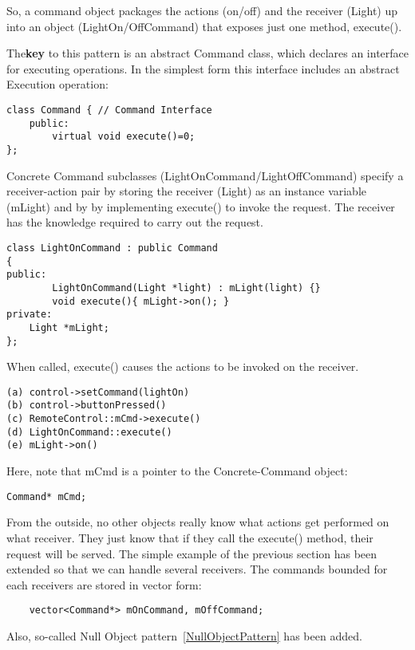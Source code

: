 \documentclass{book}
\begin{document}
So, a command object packages the actions (on/off) and the receiver (Light) up into an object (LightOn/OffCommand) that exposes just one method, execute().

The\textbf{key} to this pattern is an abstract Command class, which declares an interface for executing operations. In the simplest form this interface includes an abstract Execution operation:

\begin{verbatim}
class Command { // Command Interface
    public:
    	virtual void execute()=0;
};
\end{verbatim}
Concrete Command subclasses (LightOnCommand/LightOffCommand) specify a receiver-action pair by storing the receiver (Light) as an instance variable (mLight) and by 
by implementing execute() to invoke the request. The receiver has the knowledge required to carry out the request.
\begin{verbatim}
class LightOnCommand : public Command 
{
public:
        LightOnCommand(Light *light) : mLight(light) {}
	    void execute(){ mLight->on(); }
private:
	Light *mLight;
};
\end{verbatim}
When called, execute() causes the actions to be invoked on the receiver.
\begin{verbatim}
(a) control->setCommand(lightOn)
(b) control->buttonPressed()
(c) RemoteControl::mCmd->execute() 
(d) LightOnCommand::execute()
(e) mLight->on()
\end{verbatim}
Here, note that mCmd is a pointer to the Concrete-Command object:

\begin{verbatim}
Command* mCmd;
\end{verbatim}

From the outside, no other objects really know what actions get performed on what receiver. They just know that if they call the execute() method, their request will be served.
The simple example of the previous section has been extended so that we can handle several receivers. The commands bounded for each receivers are stored in vector form:
\begin{verbatim}
	vector<Command*> mOnCommand, mOffCommand;
\end{verbatim}
Also, so-called Null Object pattern~\ref{NullObjectPattern} has been added.
\end{document}
